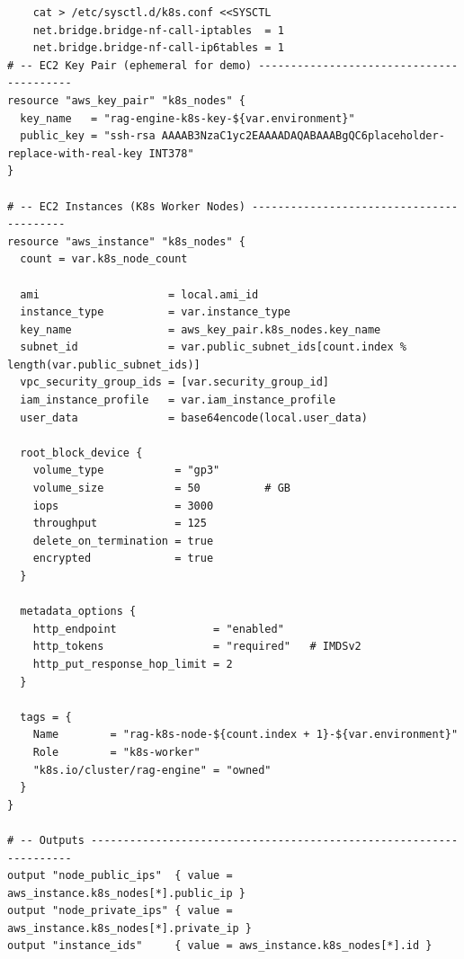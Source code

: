 \documentclass[12pt,a4paper]{report}
\begin{document}
\begin{lstlisting}
    cat > /etc/sysctl.d/k8s.conf <<SYSCTL
    net.bridge.bridge-nf-call-iptables  = 1
    net.bridge.bridge-nf-call-ip6tables = 1
# -- EC2 Key Pair (ephemeral for demo) -----------------------------------------
resource "aws_key_pair" "k8s_nodes" {
  key_name   = "rag-engine-k8s-key-${var.environment}"
  public_key = "ssh-rsa AAAAB3NzaC1yc2EAAAADAQABAAABgQC6placeholder-replace-with-real-key INT378"
}

# -- EC2 Instances (K8s Worker Nodes) -----------------------------------------
resource "aws_instance" "k8s_nodes" {
  count = var.k8s_node_count

  ami                    = local.ami_id
  instance_type          = var.instance_type
  key_name               = aws_key_pair.k8s_nodes.key_name
  subnet_id              = var.public_subnet_ids[count.index % length(var.public_subnet_ids)]
  vpc_security_group_ids = [var.security_group_id]
  iam_instance_profile   = var.iam_instance_profile
  user_data              = base64encode(local.user_data)

  root_block_device {
    volume_type           = "gp3"
    volume_size           = 50          # GB
    iops                  = 3000
    throughput            = 125
    delete_on_termination = true
    encrypted             = true
  }

  metadata_options {
    http_endpoint               = "enabled"
    http_tokens                 = "required"   # IMDSv2
    http_put_response_hop_limit = 2
  }

  tags = {
    Name        = "rag-k8s-node-${count.index + 1}-${var.environment}"
    Role        = "k8s-worker"
    "k8s.io/cluster/rag-engine" = "owned"
  }
}

# -- Outputs -------------------------------------------------------------------
output "node_public_ips"  { value = aws_instance.k8s_nodes[*].public_ip }
output "node_private_ips" { value = aws_instance.k8s_nodes[*].private_ip }
output "instance_ids"     { value = aws_instance.k8s_nodes[*].id }
\end{lstlisting}
\end{document}
